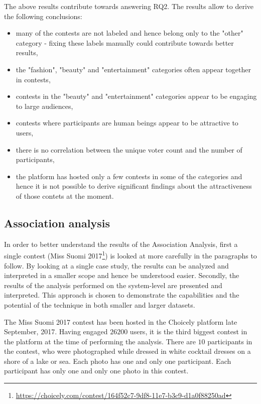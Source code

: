     The above results contribute towards answering RQ2. The results allow to derive the following conclusions: 

    \begin{itemize}
        \item many of the contests are not labeled and hence belong only to the "other" category - fixing these labels manually could contribute towards better results,
        \item the "fashion", "beauty" and "entertainment" categories often appear together in contests,
        \item contests in the "beauty" and "entertainment" categories appear to be engaging to large audiences,
        \item contests where participants are human beings appear to be attractive to users,
        \item there is no correlation between the unique voter count and the number of participants,
        \item the platform has hosted only a few contests in some of the categories and hence it is not possible to derive significant findings about the attractiveness of those contets at the moment.
    \end{itemize}

\subsection{Association analysis}
In order to better understand the results of the Association Analysis, first a single contest (Miss Suomi 2017\footnote{\url{https://choicely.com/contest/164f52c7-9df8-11e7-b3c9-d1a0f88250ad}}) is looked at more carefully in the paragraphs to follow. By looking at a single case study, the results can be analyzed and interpreted in a smaller scope and hence be understood easier. Secondly, the results of the analysis performed on the system-level are presented and interpreted. This approach is chosen to demonstrate the capabilities and the potential of the technique in both smaller and larger datasets.

The Miss Suomi 2017 contest has been hosted in the Choicely platform late September, 2017. Having engaged $26 200$ users, it is the third biggest contest in the platform at the time of performing the analysis. There are $10$ participants in the contest, who were photographed while dressed in white cocktail dresses on a shore of a lake or sea. Each photo has one and only one participant. Each participant has only one and only one photo in this contest. 

